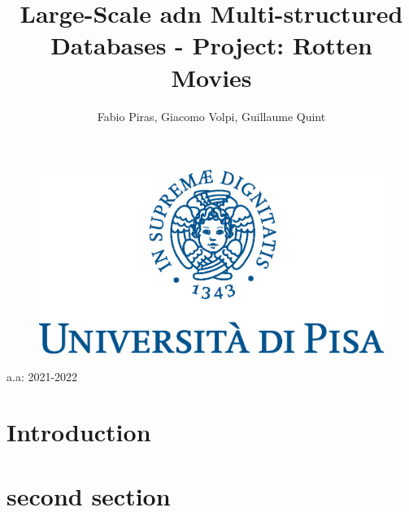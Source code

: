 \documentclass[12]{article}
\author{Fabio Piras, Giacomo Volpi, Guillaume Quint}
\title{Large-Scale adn Multi-structured Databases - Project: Rotten Movies}
\date{}
\begin{document}
\begin{figure}
\centering
\includegraphics[scale=0.75]{cherubino}

\end{figure}

\maketitle
\centering
a.a: 2021-2022

\newpage

\tableofcontents


\newpage

\section{Introduction}
\justifying
\blindtext

\section{second section}
\blindtext
\newpage
\end{document}
